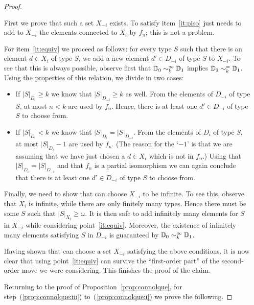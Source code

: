 \begin{proof}
\begin{pfclaim}
First we prove that such a set $X_{-i}$ exists. 
To satisfy item~\eqref{it:piso} \eloise just needs to add to $X_{-i}$ the 
elements connected to $X_i$ by $f_n$; this is not a problem.

For item~\eqref{it:equiv} we proceed as follows: for every type $S$ such that 
there is an element $d\in X_i$ of type $S$, we add a new element $d'\in D_{-i}$
of type $S$ to $X_{-i}$. 
To see that this is always possible, observe first that $\mathbb{D}_0 
\sim_k^\infty \mathbb{D}_1$ implies $\mathbb{D}_0 \sim_k^= \mathbb{D}_1$. 
Using the properties of this relation, we divide in two cases:
%
\begin{itemize}
\item If $|S|_{D_i} \geq k$ we know that $|S|_{D_{-i}} \geq k$ as well. 
From the elements of $D_{-i}$ of type $S$, at most $n<k$ are used by $f_n$. 
Hence, there is at least one $d'\in D_{-i}$ of type $S$ to choose from.

\item If $|S|_{D_i} < k$ we know that $|S|_{D_{i}} = |S|_{D_{-i}}$. 
From the elements of $D_{i}$ of type $S$, at most $|S|_{D_{i}}-1$ are used by 
$f_n$. 
(The reason for the `$-1$' is that we are assuming that we have just chosen a 
$d\in X_i$ which is not in $f_n$.) 
Using that $|S|_{D_{i}} = |S|_{D_{-i}}$ and that $f_n$ is a partial isomorphism 
we can again conclude that there is at least one $d'\in D_{-i}$ of type $S$ to 
choose from.
\end{itemize}
	
Finally, we need to show that \eloise can choose $X_{-i}$ to be infinite.
To see this, observe that $X_{i}$ is infinite, while there are only finitely 
many types.
Hence there must be some $S$ such that $|S|_{X_i} \geq \omega$. 
It is then safe to add infinitely many elements for $S$ in $X_{-i}$ while 
considering point~\eqref{it:equiv}. 
Moreover, the existence of infinitely many elements satisfying $S$ in $D_{-i}$
is guaranteed by $\mathbb{D}_0 \sim_k^\infty \mathbb{D}_1$.

Having shown that \eloise can choose a set $X_{-i}$ satisfying the above 
conditions, it is now clear that using point~\eqref{it:equiv} \eloise can 
survive the ``first-order part'' of the second-order move we were considering.
This finishes the proof of the claim.
\end{pfclaim}

\noindent
Returning to the proof of Proposition~\ref{prop:connolque}, for 
step~(\ref{prop:connolque:iii}) to~(\ref{prop:connolque:i}) we prove the following.
	

\end{proof}
